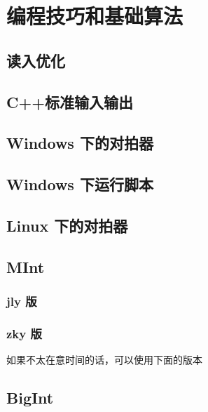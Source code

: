 \chapter{编程技巧和基础算法}

\section{读入优化}


\section{C++标准输入输出}
















\section{Windows 下的对拍器}


\section{Windows 下运行脚本}


\section{Linux 下的对拍器}



\section{MInt}
\subsection{jly 版}


\subsection{zky 版}
如果不太在意时间的话，可以使用下面的版本



\section{BigInt}

